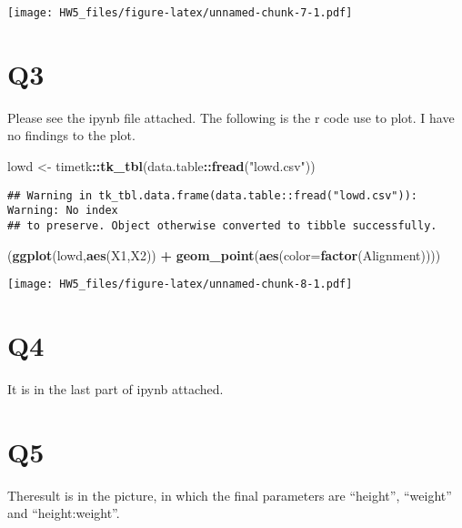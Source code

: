 \documentclass[]{article}
\newenvironment{Shaded}{\begin{snugshade}}{\end{snugshade}}
\newcommand{\DataTypeTok}[1]{\textcolor[rgb]{0.13,0.29,0.53}{#1}}
\newcommand{\KeywordTok}[1]{\textcolor[rgb]{0.13,0.29,0.53}{\textbf{#1}}}
\newcommand{\NormalTok}[1]{#1}
\newcommand{\OperatorTok}[1]{\textcolor[rgb]{0.81,0.36,0.00}{\textbf{#1}}}
\newcommand{\StringTok}[1]{\textcolor[rgb]{0.31,0.60,0.02}{#1}}
\begin{document}
\texttt{[image: HW5\_files/figure-latex/unnamed-chunk-7-1.pdf]}

\hypertarget{q3}{%
\section{Q3}\label{q3}}

Please see the ipynb file attached. The following is the r code use to
plot. I have no findings to the plot.

\begin{Shaded}
\begin{Highlighting}[]
\NormalTok{lowd <-}\StringTok{ }\NormalTok{timetk}\OperatorTok{::}\KeywordTok{tk_tbl}\NormalTok{(data.table}\OperatorTok{::}\KeywordTok{fread}\NormalTok{(}\StringTok{"lowd.csv"}\NormalTok{))}
\end{Highlighting}
\end{Shaded}

\begin{verbatim}
## Warning in tk_tbl.data.frame(data.table::fread("lowd.csv")): Warning: No index
## to preserve. Object otherwise converted to tibble successfully.
\end{verbatim}

\begin{Shaded}
\begin{Highlighting}[]
\NormalTok{(}\KeywordTok{ggplot}\NormalTok{(lowd,}\KeywordTok{aes}\NormalTok{(X1,X2)) }\OperatorTok{+}\StringTok{ }\KeywordTok{geom_point}\NormalTok{(}\KeywordTok{aes}\NormalTok{(}\DataTypeTok{color=}\KeywordTok{factor}\NormalTok{(Alignment))))}
\end{Highlighting}
\end{Shaded}

\texttt{[image: HW5\_files/figure-latex/unnamed-chunk-8-1.pdf]}

\hypertarget{q4}{%
\section{Q4}\label{q4}}

It is in the last part of ipynb attached.

\hypertarget{q5}{%
\section{Q5}\label{q5}}

Theresult is in the picture, in which the final parameters are
``height'', ``weight'' and ``height:weight''.
\end{document}
